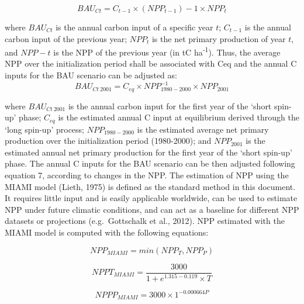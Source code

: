 \documentclass[
  10pt,
  b5paper,
]{book}
\begin{document}
\begin{equation}
\tag{6.4}
BAU_{Ct} = C_{t-1} \times (NPP_{t-1})-1 \times NPP_t
\end{equation}

where \(BAU_{Ct}\) is the annual carbon input of a specific year \(t\); \(C_{t-1}\) is the annual carbon input of the previous year; \(NPP_t\) is the net primary production of year \(t\), and \(NPP-t\) is the NPP of the previous year (in tC ha\textsuperscript{-1}). Thus, the average NPP over the initialization period shall be associated with Ceq and the annual C inputs for the BAU scenario can be adjusted as:
\begin{equation}
\tag{6.5}
BAU_{Ct \ 2001} = C_{eq} \times NPP_{1980-2000}^{-1} \times NPP_{2001}                                                 
\end{equation}

where \(BAU_{Ct \ 2001}\) is the annual carbon input for the first year of the `short spin-up' phase; \(C_{eq}\) is the estimated annual C input at equilibrium derived through the `long spin-up' process; \(NPP_{1980-2000}\) is the estimated average net primary production over the initialization period (1980-2000); and \(NPP_{2001}\) is the estimated annual net primary production for the first year of the `short spin-up' phase. The annual C inputs for the BAU scenario can be then adjusted following equation 7, according to changes in the NPP.
The estimation of NPP using the MIAMI model (Lieth, 1975) is defined as the standard method in this document. It requires little input and is easily applicable worldwide, can be used to estimate NPP under future climatic conditions, and can act as a baseline for different NPP datasets or projections (e.g.~Gottschalk et al., 2012). NPP estimated with the MIAMI model is computed with the following equations:

\begin{equation}
\tag{6.6}
NPP_{MIAMI}= min(NPP_T , NPP_P)                                                                       
\end{equation}

\begin{equation}
\tag{6.7}
NPPT_{MIAMI}= \frac{3000}{1 + e^{1.315-0.119} \times T}  
\end{equation}

\begin{equation}
\tag{6.8}
NPPP_{MIAMI} = 3000 \times 1^{-0.000664P} 
\end{equation}
\end{document}
